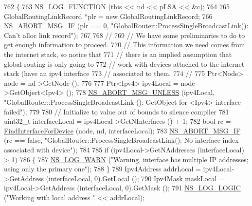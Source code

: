 \begin{DoxyCode}
762 \{
763   \hyperlink{log-macros-disabled_8h_a90b90d5bad1f39cb1b64923ea94c0761}{NS\_LOG\_FUNCTION} (\textcolor{keyword}{this} << nd << pLSA << &\hyperlink{lte_2model_2fading-traces_2fading__trace__generator_8m_ae0323a9039add2978bf5b49550572c7c}{c});
764 
765   GlobalRoutingLinkRecord *plr = \textcolor{keyword}{new} GlobalRoutingLinkRecord;
766   \hyperlink{group__fatal_ga6653324225bc139e46deea177614ceee}{NS\_ABORT\_MSG\_IF} (plr == 0, \textcolor{stringliteral}{"GlobalRouter::ProcessSingleBroadcastLink(): Can't alloc link
       record"});
767 
768   \textcolor{comment}{//}
769   \textcolor{comment}{// We have some preliminaries to do to get enough information to proceed.}
770   \textcolor{comment}{// This information we need comes from the internet stack, so notice that}
771   \textcolor{comment}{// there is an implied assumption that global routing is only going to }
772   \textcolor{comment}{// work with devices attached to the internet stack (have an ipv4 interface}
773   \textcolor{comment}{// associated to them.}
774   \textcolor{comment}{//}
775   Ptr<Node> node = nd->GetNode ();
776 
777   Ptr<Ipv4> ipv4Local = node->GetObject<Ipv4> ();
778   \hyperlink{group__fatal_ga0bd3f62c55e7347ff814572f3aaa3864}{NS\_ABORT\_MSG\_UNLESS} (ipv4Local, \textcolor{stringliteral}{"GlobalRouter::ProcessSingleBroadcastLink ():
       GetObject for <Ipv4> interface failed"});
779 
780   \textcolor{comment}{// Initialize to value out of bounds to silence compiler}
781   uint32\_t interfaceLocal = ipv4Local->GetNInterfaces () + 1;
782   \textcolor{keywordtype}{bool} rc = \hyperlink{classns3_1_1GlobalRouter_a7b30c3c09f93e3f3ac7cfe787b51d127}{FindInterfaceForDevice} (node, nd, interfaceLocal);
783   \hyperlink{group__fatal_ga6653324225bc139e46deea177614ceee}{NS\_ABORT\_MSG\_IF} (rc == \textcolor{keyword}{false}, \textcolor{stringliteral}{"GlobalRouter::ProcessSingleBroadcastLink(): No interface
       index associated with device"});
784 
785   \textcolor{keywordflow}{if} (ipv4Local->GetNAddresses (interfaceLocal) > 1)
786     \{
787       \hyperlink{group__logging_gade7208b4009cdf0e25783cd26766f559}{NS\_LOG\_WARN} (\textcolor{stringliteral}{"Warning, interface has multiple IP addresses; using only the primary one"});
788     \}
789   Ipv4Address addrLocal = ipv4Local->GetAddress (interfaceLocal, 0).GetLocal ();
790   Ipv4Mask maskLocal = ipv4Local->GetAddress (interfaceLocal, 0).GetMask ();
791   \hyperlink{group__logging_ga88acd260151caf2db9c0fc84997f45ce}{NS\_LOG\_LOGIC} (\textcolor{stringliteral}{"Working with local address "} << addrLocal);

\end{DoxyCode}
